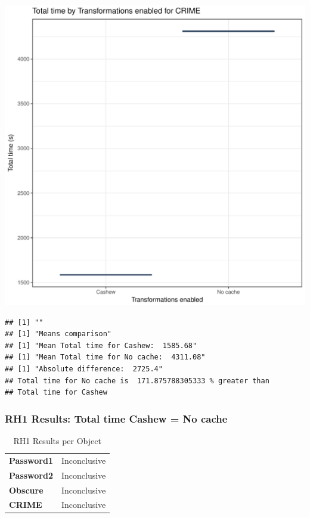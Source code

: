 \documentclass{article}\usepackage[]{graphicx}\usepackage[]{color}
\makeatletter
\def\maxwidth{ %
  \ifdim\Gin@nat@width>\linewidth
    \linewidth
  \else
    \Gin@nat@width
  \fi
}
\newenvironment{kframe}{%
 \def\at@end@of@kframe{}%
 \ifinner\ifhmode%
  \def\at@end@of@kframe{\end{minipage}}%
  \begin{minipage}{\columnwidth}%
 \fi\fi%
 \def\FrameCommand##1{\hskip\@totalleftmargin \hskip-\fboxsep
 \colorbox{shadecolor}{##1}\hskip-\fboxsep
     \hskip-\linewidth \hskip-\@totalleftmargin \hskip\columnwidth}%
 \MakeFramed {\advance\hsize-\width
   \@totalleftmargin\z@ \linewidth\hsize
   \@setminipage}}%
 {\par\unskip\endMakeFramed%
 \at@end@of@kframe}
\newenvironment{knitrout}{}{} %
\makeatother
\begin{document}
\begin{knitrout}
\color{fgcolor}
\includegraphics[width=\maxwidth]{figure/RH1_crime-1} 
\begin{kframe}

{\ttfamily\noindent\bfseries\color{errorcolor}{\#\# Error in eval(expr, envir, enclos): object 'shap\_cashew\_crime' not found}}\begin{verbatim}
## [1] ""
## [1] "Means comparison"
## [1] "Mean Total time for Cashew:  1585.68"
## [1] "Mean Total time for No cache:  4311.08"
## [1] "Absolute difference:  2725.4"
## Total time for No cache is  171.875788305333 % greater than 
## Total time for Cashew
\end{verbatim}
\end{kframe}
\end{knitrout}


 

	
	\subsubsection{RH1 Results: Total time Cashew = No cache}
	
	
	\begin{table}[H]
	\centering
	\caption{RH1 Results per Object}
	\begin{tabular}{ll}
	\textbf{Password1} & Inconclusive \\
	\textbf{Password2} & Inconclusive \\
	\textbf{Obscure} & Inconclusive \\
	\textbf{CRIME} & Inconclusive \\
	\end{tabular}
	\end{table}
\end{document}
